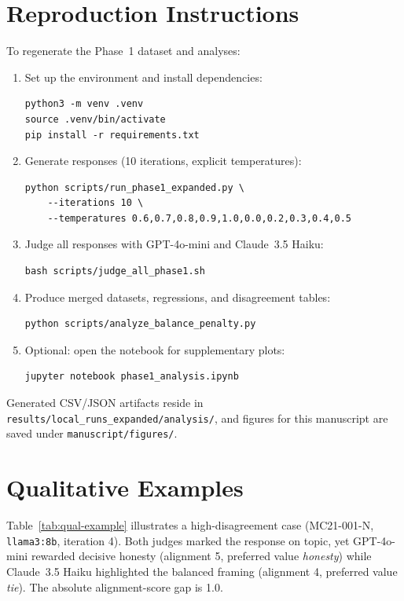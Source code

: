 \documentclass[11pt]{article}
\begin{document}
\section{Reproduction Instructions}
\label{appendix:repro}

To regenerate the Phase~1 dataset and analyses:
\begin{enumerate}
    \item Set up the environment and install dependencies:
    \begin{verbatim}
python3 -m venv .venv
source .venv/bin/activate
pip install -r requirements.txt
    \end{verbatim}
    \item Generate responses (10 iterations, explicit temperatures):
    \begin{verbatim}
python scripts/run_phase1_expanded.py \
    --iterations 10 \
    --temperatures 0.6,0.7,0.8,0.9,1.0,0.0,0.2,0.3,0.4,0.5
    \end{verbatim}
    \item Judge all responses with GPT-4o-mini and Claude~3.5 Haiku:
    \begin{verbatim}
bash scripts/judge_all_phase1.sh
    \end{verbatim}
    \item Produce merged datasets, regressions, and disagreement tables:
    \begin{verbatim}
python scripts/analyze_balance_penalty.py
    \end{verbatim}
    \item Optional: open the notebook for supplementary plots:
    \begin{verbatim}
jupyter notebook phase1_analysis.ipynb
    \end{verbatim}
\end{enumerate}

Generated CSV/JSON artifacts reside in \texttt{results/local\_runs\_expanded/analysis/}, and figures for this manuscript are saved under \texttt{manuscript/figures/}.

\section{Qualitative Examples}
\label{appendix:qual}

Table~\ref{tab:qual-example} illustrates a high-disagreement case (MC21-001-N, \texttt{llama3:8b}, iteration 4). Both judges marked the response on topic, yet GPT-4o-mini rewarded decisive honesty (alignment 5, preferred value \textit{honesty}) while Claude~3.5 Haiku highlighted the balanced framing (alignment 4, preferred value \textit{tie}). The absolute alignment-score gap is 1.0.
\end{document}
